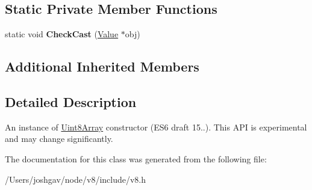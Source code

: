 \subsection*{Static Private Member Functions}
\begin{DoxyCompactItemize}
\item 
static void {\bfseries Check\+Cast} (\hyperlink{classv8_1_1_value}{Value} $\ast$obj)\hypertarget{classv8_1_1_uint8_array_ac87b0988778f67950e27048f71ee24f1}{}\label{classv8_1_1_uint8_array_ac87b0988778f67950e27048f71ee24f1}

\end{DoxyCompactItemize}
\subsection*{Additional Inherited Members}


\subsection{Detailed Description}
An instance of \hyperlink{classv8_1_1_uint8_array}{Uint8\+Array} constructor (E\+S6 draft 15..). This A\+PI is experimental and may change significantly. 

The documentation for this class was generated from the following file\+:\begin{DoxyCompactItemize}
\item 
/\+Users/joshgav/node/v8/include/v8.\+h\end{DoxyCompactItemize}
